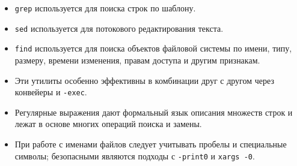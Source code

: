 \documentclass[12pt,a4paper]{article}
\begin{document}
\begin{itemize}
    \item \texttt{grep} используется для поиска строк по шаблону.
    \item \texttt{sed} используется для потокового редактирования текста.
    \item \texttt{find} используется для поиска объектов файловой системы по имени, типу, размеру, времени изменения, правам доступа и другим признакам.
    \item Эти утилиты особенно эффективны в комбинации друг с другом через конвейеры и \texttt{-exec}.
    \item Регулярные выражения дают формальный язык описания множеств строк и лежат в основе многих операций поиска и замены.
    \item При работе с именами файлов следует учитывать пробелы и специальные символы; безопасными являются подходы с \texttt{-print0} и \texttt{xargs -0}.
\end{itemize}
\end{document}
